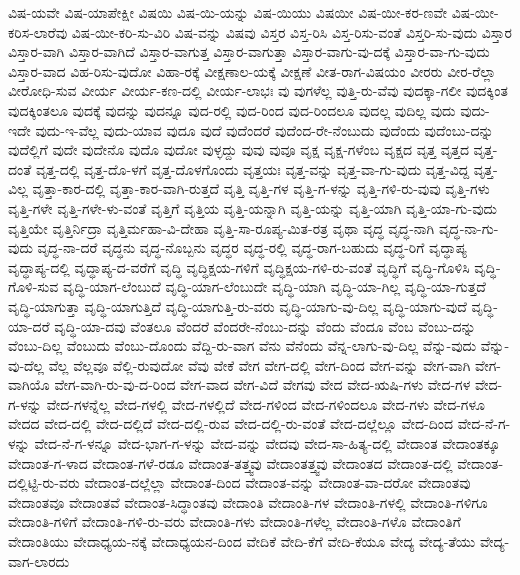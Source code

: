 {ವಿಷ-ಯವೇ
ವಿಷ-ಯಾಪೇಕ್ಷೀ
ವಿಷಯಿ
ವಿಷ-ಯಿ-ಯನ್ನು
ವಿಷ-ಯಿಯು
ವಿಷಯೀ
ವಿಷ-ಯೀ-ಕರ-ಣವೇ
ವಿಷ-ಯೀ-ಕರಿಸ-ಲಾರೆವು
ವಿಷ-ಯೀ-ಕರಿ-ಸು-ವಿರಿ
ವಿಷ-ವನ್ನು
ವಿಷವು
ವಿಸ್ತರ
ವಿಸ್ತ-ರಿಸಿ
ವಿಸ್ತ-ರಿಸು-ವಂತೆ
ವಿಸ್ತರಿ-ಸು-ವುದು
ವಿಸ್ತಾರ
ವಿಸ್ತಾರ-ವಾಗಿ
ವಿಸ್ತಾರ-ವಾಗಿದೆ
ವಿಸ್ತಾರ-ವಾಗುತ್ತ
ವಿಸ್ತಾರ-ವಾಗುತ್ತಾ
ವಿಸ್ತಾರ-ವಾಗು-ವು-ದಕ್ಕೆ
ವಿಸ್ತಾರ-ವಾ-ಗು-ವುದು
ವಿಸ್ತಾರ-ವಾದ
ವಿಹ-ರಿಸು-ವುದೋ
ವಿಹಾ-ರಕ್ಕೆ
ವೀಕ್ಷಣಾಲ-ಯಕ್ಕೆ
ವೀಕ್ಷಣೆ
ವೀತ-ರಾಗ-ವಿಷಯಂ
ವೀರರು
ವೀರ-ರೆಲ್ಲಾ
ವೀರೋಧಿ-ಸುವ
ವೀರ್ಯ
ವೀರ್ಯ-ಕಣ-ದಲ್ಲಿ
ವೀರ್ಯ-ಲಾಭಃ
ವು
ವುಗಳೆಲ್ಲ
ವುತ್ತಿ-ರು-ವೆವು
ವುದಕ್ಕಾ-ಗಲೀ
ವುದಕ್ಕಿಂತ
ವುದಕ್ಕಿಂತಲೂ
ವುದಕ್ಕೆ
ವುದನ್ನು
ವುದನ್ನೂ
ವುದ-ರಲ್ಲಿ
ವುದ-ರಿಂದ
ವುದ-ರಿಂದಲೂ
ವುದಲ್ಲ
ವುದಿಲ್ಲ
ವುದು
ವುದು-ಇದೇ
ವುದು-ಇ-ವೆಲ್ಲ
ವುದು-ಯಾವ
ವುದೂ
ವುದೆ
ವುದೆಂದರೆ
ವುದೆಂದ-ರೇ-ನೆಂಬುದು
ವುದೆಂದು
ವುದೆಂಬು-ದನ್ನು
ವುದೆಲ್ಲಿಗೆ
ವುದೇ
ವುದೇನೊ
ವುದೊ
ವುದೋ
ವುಳ್ಳದ್ದು
ವುವು
ವುವೂ
ವೃಕ್ಷ
ವೃಕ್ಷ-ಗಳೆಂಬ
ವೃಕ್ಷದ
ವೃತ್ತ
ವೃತ್ತದ
ವೃತ್ತ-ದಂತೆ
ವೃತ್ತ-ದಲ್ಲಿ
ವೃತ್ತ-ದೊ-ಳಗೆ
ವೃತ್ತ-ದೊಳಗೊಂದು
ವೃತ್ತಯಃ
ವೃತ್ತ-ವನ್ನು
ವೃತ್ತ-ವಾ-ಗು-ವುದು
ವೃತ್ತ-ವಿದ್ದ
ವೃತ್ತ-ವಿಲ್ಲ
ವೃತ್ತಾ-ಕಾರ-ದಲ್ಲಿ
ವೃತ್ತಾ-ಕಾರ-ವಾಗಿ-ರುತ್ತದೆ
ವೃತ್ತಿ
ವೃತ್ತಿ-ಗಳ
ವೃತ್ತಿ-ಗ-ಳನ್ನು
ವೃತ್ತಿ-ಗಳಿ-ರು-ವುವು
ವೃತ್ತಿ-ಗಳು
ವೃತ್ತಿ-ಗಳೇ
ವೃತ್ತಿ-ಗಳೇ-ಳು-ವಂತೆ
ವೃತ್ತಿಗೆ
ವೃತ್ತಿಯ
ವೃತ್ತಿ-ಯನ್ನಾಗಿ
ವೃತ್ತಿ-ಯನ್ನು
ವೃತ್ತಿ-ಯಾಗಿ
ವೃತ್ತಿ-ಯಾ-ಗು-ವುದು
ವೃತ್ತಿಯೇ
ವೃತ್ತಿರ್ನಿದ್ರಾ
ವೃತ್ತಿರ್ಮಹಾ-ವಿ-ದೇಹಾ
ವೃತ್ತಿ-ಸಾ-ರೂಪ್ಯ-ಮಿತ-ರತ್ರ
ವೃಥಾ
ವೃದ್ಧ
ವೃದ್ಧ-ನಾಗಿ
ವೃದ್ಧ-ನಾ-ಗು-ವುದು
ವೃದ್ಧ-ನಾ-ದರೆ
ವೃದ್ಧನು
ವೃದ್ಧ-ನೊಬ್ಬನು
ವೃದ್ಧರ
ವೃದ್ಧ-ರಲ್ಲಿ
ವೃದ್ಧ-ರಾಗ-ಬಹುದು
ವೃದ್ಧ-ರಿಗೆ
ವೃದ್ಧಾಪ್ಯ
ವೃದ್ಧಾಪ್ಯ-ದಲ್ಲಿ
ವೃದ್ಧಾಪ್ಯ-ದ-ವರೆಗೆ
ವೃದ್ಧಿ
ವೃದ್ಧಿಕ್ಷಯ-ಗಳಿಗೆ
ವೃದ್ಧಿಕ್ಷಯ-ಗಳಿ-ರು-ವಂತೆ
ವೃದ್ಧಿಗೆ
ವೃದ್ಧಿ-ಗೊಳಿಸಿ
ವೃದ್ಧಿ-ಗೊಳಿ-ಸುವ
ವೃದ್ಧಿ-ಯಾಗ-ಲೆಂಬುದೆ
ವೃದ್ಧಿ-ಯಾಗ-ಲೆಂಬುದೇ
ವೃದ್ಧಿ-ಯಾಗಿ
ವೃದ್ಧಿ-ಯಾ-ಗಿಲ್ಲ
ವೃದ್ಧಿ-ಯಾ-ಗುತ್ತದೆ
ವೃದ್ಧಿ-ಯಾಗುತ್ತಾ
ವೃದ್ಧಿ-ಯಾಗುತ್ತಿದೆ
ವೃದ್ಧಿ-ಯಾಗುತ್ತಿ-ರು-ವರು
ವೃದ್ಧಿ-ಯಾಗು-ವು-ದಿಲ್ಲ
ವೃದ್ಧಿ-ಯಾಗು-ವುದೆ
ವೃದ್ಧಿ-ಯಾ-ದರೆ
ವೃದ್ಧಿ-ಯಾ-ದವು
ವೆಂತಲೂ
ವೆಂದರೆ
ವೆಂದರೇ-ನೆಂಬು-ದನ್ನು
ವೆಂದು
ವೆಂದೂ
ವೆಂಬ
ವೆಂಬು-ದನ್ನು
ವೆಂಬು-ದಿಲ್ಲ
ವೆಂಬುದು
ವೆಂಬು-ದೊಂದು
ವೆದ್ದಿ-ರು-ವಾಗ
ವೆನು
ವೆನೆಂದು
ವೆನ್ನ-ಲಾಗು-ವು-ದಿಲ್ಲ
ವೆನ್ನು-ವುದು
ವೆನ್ನು-ವು-ದೆಲ್ಲ
ವೆಲ್ಲ
ವೆಲ್ಲವೂ
ವೆಲ್ಲಿ-ರುವುದೋ
ವೆವು
ವೇಕೆ
ವೇಗ
ವೇಗ-ದಲ್ಲಿ
ವೇಗ-ದಿಂದ
ವೇಗ-ವನ್ನು
ವೇಗ-ವಾಗಿ
ವೇಗ-ವಾಗಿಯೊ
ವೇಗ-ವಾಗಿ-ರು-ವು-ದ-ರಿಂದ
ವೇಗ-ವಾದ
ವೇಗ-ವಿದೆ
ವೇಗವು
ವೇದ
ವೇದ-ಋಷಿ-ಗಳು
ವೇದ-ಗಳ
ವೇದ-ಗ-ಳನ್ನು
ವೇದ-ಗಳನ್ನೆಲ್ಲ
ವೇದ-ಗಳಲ್ಲಿ
ವೇದ-ಗಳಲ್ಲಿದೆ
ವೇದ-ಗಳಿಂದ
ವೇದ-ಗಳಿಂದಲೂ
ವೇದ-ಗಳು
ವೇದ-ಗಳೂ
ವೇದದ
ವೇದ-ದಲ್ಲಿ
ವೇದ-ದಲ್ಲಿದೆ
ವೇದ-ದಲ್ಲಿ-ರುವ
ವೇದ-ದಲ್ಲಿ-ರು-ವಂತೆ
ವೇದ-ದಲ್ಲೆಲ್ಲೂ
ವೇದ-ದಿಂದ
ವೇದ-ನೆ-ಗ-ಳನ್ನು
ವೇದ-ನೆ-ಗ-ಳನ್ನೂ
ವೇದ-ಭಾಗ-ಗ-ಳನ್ನು
ವೇದ-ವನ್ನು
ವೇದವು
ವೇದ-ಸಾ-ಹಿತ್ಯ-ದಲ್ಲಿ
ವೇದಾಂತ
ವೇದಾಂತಕ್ಕೂ
ವೇದಾಂತ-ಗ-ಳಾದ
ವೇದಾಂತ-ಗಳೆ-ರಡೂ
ವೇದಾಂತ-ತತ್ತ್ವವು
ವೇದಾಂತತ್ತ್ವವು
ವೇದಾಂತದ
ವೇದಾಂತ-ದಲ್ಲಿ
ವೇದಾಂತ-ದಲ್ಲಿಟ್ಟಿ-ರು-ವರು
ವೇದಾಂತ-ದಲ್ಲೆಲ್ಲಾ
ವೇದಾಂತ-ದಿಂದ
ವೇದಾಂತ-ವನ್ನು
ವೇದಾಂತ-ವಾ-ದರೋ
ವೇದಾಂತವು
ವೇದಾಂತವೂ
ವೇದಾಂತವೆ
ವೇದಾಂತ-ಸಿದ್ಧಾಂತವು
ವೇದಾಂತಿ
ವೇದಾಂತಿ-ಗಳ
ವೇದಾಂತಿ-ಗಳಲ್ಲಿ
ವೇದಾಂತಿ-ಗಳಿಗೂ
ವೇದಾಂತಿ-ಗಳಿಗೆ
ವೇದಾಂತಿ-ಗಳಿ-ರು-ವರು
ವೇದಾಂತಿ-ಗಳು
ವೇದಾಂತಿ-ಗಳೆಲ್ಲ
ವೇದಾಂತಿ-ಗಳೊ
ವೇದಾಂತಿಗೆ
ವೇದಾಂತಿಯು
ವೇದಾಧ್ಯಯ-ನಕ್ಕೆ
ವೇದಾಧ್ಯಯನ-ದಿಂದ
ವೇದಿಕೆ
ವೇದಿ-ಕೆಗೆ
ವೇದಿ-ಕೆಯೂ
ವೇದ್ಯ
ವೇದ್ಯ-ತೆಯು
ವೇದ್ಯ-ವಾಗ-ಲಾರದು
}
